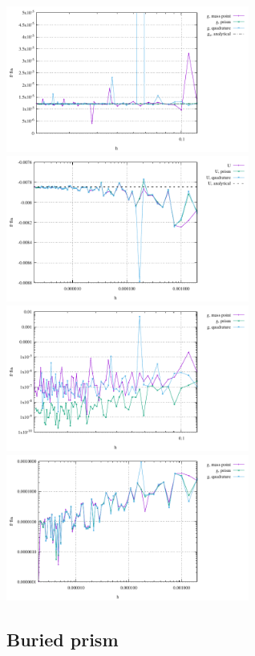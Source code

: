 \begin{center}
\includegraphics[width=8cm]{python_codes/fieldstone_84/sphere/single_point_g.pdf}
\includegraphics[width=8cm]{python_codes/fieldstone_84/sphere/single_point_U.pdf}\\
\includegraphics[width=8cm]{python_codes/fieldstone_84/sphere/single_point_g_error.pdf}
\includegraphics[width=8cm]{python_codes/fieldstone_84/sphere/single_point_U_error.pdf}
\end{center}


\newpage
\subsection*{Buried prism}

